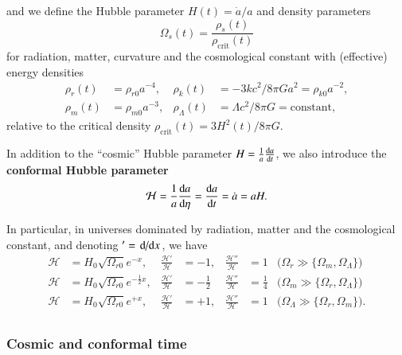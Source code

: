 \documentclass{aa}
\begin{document}
and we define the Hubble parameter $H(t) = \dot{a} / a$
and density parameters
\begin{equation}
	\Omega_s(t) = \frac{\rho_s(t)}{\rho_\text{crit}(t)}
\label{eq_density_parameters}
\end{equation}
for radiation, matter, curvature and the cosmological constant
with (effective) energy densities
\begin{equation}
\begin{aligned}
	\rho_r(t) &= \rho_{r0} a^{-4}, &
	\rho_k(t) &= - 3kc^2 / 8 \pi G a^2 = \rho_{k0} a^{-2}, \\
	\rho_m(t) &= \rho_{m0} a^{-3}, &
	\rho_\Lambda(t) &= \Lambda c^2 / 8 \pi G = \text{constant},
\end{aligned}
\end{equation}
relative to the critical density
$\rho_\text{crit}(t) = 3H^2(t)/8\pi G$.

In addition to the ``cosmic'' Hubble parameter $H = \frac1a \odv{a}{t}$,
we also introduce the \textbf{conformal Hubble parameter}
\begin{equation}
	\mathcal{H} = \frac1a \odv{a}{\eta} = \odv{a}{t} = \dot{a} = a H.
\label{eq_conformal_hubble}
\end{equation}

In particular, in universes dominated by radiation, matter and the cosmological constant,
and denoting $' = \odv{}/{x}$, we have
\begin{equation}
\begin{aligned}
	\mathcal{H} &= H_0 \sqrt{\Omega_{r0}} e^{-x}, &
	\frac{\mathcal{H}'}{\mathcal{H}} &= -1, &
	\frac{\mathcal{H}''}{\mathcal{H}} &= 1 & \Big(\Omega_r \gg \{\Omega_m,\Omega_\Lambda\}\Big) \\
	\mathcal{H} &= H_0 \sqrt{\Omega_{r0}} e^{-\frac12x}, &
	\frac{\mathcal{H}'}{\mathcal{H}} &= -\frac12 &
	\frac{\mathcal{H}''}{\mathcal{H}} &= \frac14 & \Big(\Omega_m \gg \{\Omega_r,\Omega_\Lambda\}\Big) \\
	\mathcal{H} &= H_0 \sqrt{\Omega_{r0}} e^{+x}, &
	\frac{\mathcal{H}'}{\mathcal{H}} &= +1, &
	\frac{\mathcal{H}''}{\mathcal{H}} &= 1 & \Big(\Omega_\Lambda \gg \{\Omega_r,\Omega_m\}\Big).\\
\end{aligned}
\label{eq_conformal_hubble_dominated}
\end{equation}

\subsubsection{Cosmic and conformal time}
\end{document}
